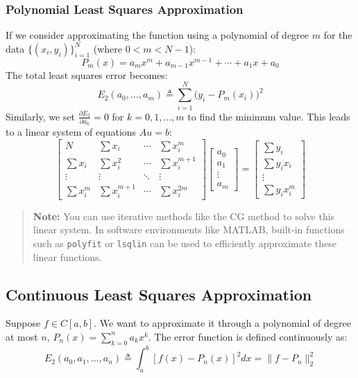 \documentclass[12pt, a4paper]{article}
\theoremstyle{break}
\begin{document}
\subsubsection*{Polynomial Least Squares Approximation}
If we consider approximating the function using a polynomial of degree $m$ for the data $\{(x_i, y_i)\}_{i=1}^N$ (where $0 < m < N-1$):
\begin{equation*}
    P_m(x) = a_m x^m + a_{m-1} x^{m-1} + \cdots + a_1 x + a_0
\end{equation*}
The total least squares error becomes:
\begin{equation*}
    E_2(a_0, \dots, a_m) \triangleq \sum_{i=1}^N \big(y_i - P_m(x_i)\big)^2
\end{equation*}
Similarly, we set $\frac{\partial E_2}{\partial a_k} = 0$ for $k = 0, 1, \dots, m$ to find the minimum value.
This leads to a linear system of equations $A u = b$:
\begin{equation*}
    \begin{bmatrix} 
    N & \sum x_i & \cdots & \sum x_i^m \\ 
    \sum x_i & \sum x_i^2 & \cdots & \sum x_i^{m+1} \\ 
    \vdots & \vdots & \ddots & \vdots \\ 
    \sum x_i^m & \sum x_i^{m+1} & \cdots & \sum x_i^{2m} 
    \end{bmatrix} 
    \begin{bmatrix} a_0 \\ a_1 \\ \vdots \\ a_m \end{bmatrix} = 
    \begin{bmatrix} \sum y_i \\ \sum y_i x_i \\ \vdots \\ \sum y_i x_i^m \end{bmatrix}
\end{equation*}

\begin{quote}
\textbf{Note:} You can use iterative methods like the CG method to solve this linear system.
In software environments like MATLAB, built-in functions such as \texttt{polyfit} or \texttt{lsqlin} can be used to efficiently approximate these linear functions.
\end{quote}

\subsection{Continuous Least Squares Approximation}
Suppose $f \in C[a,b]$. We want to approximate it through a polynomial of degree at most $n$, $P_n(x) = \sum_{k=0}^n a_k x^k$.
The error function is defined continuously as:
\begin{equation*}
    E_2(a_0, a_1, \dots, a_n) \triangleq \int_a^b [f(x) - P_n(x)]^2 dx = \|f - P_n\|_2^2
\end{equation*}
\end{document}
